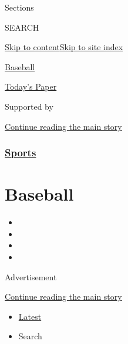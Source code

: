 Sections

SEARCH

\protect\hyperlink{site-content}{Skip to
content}\protect\hyperlink{site-index}{Skip to site index}

\href{https://www.nytimes.com/section/sports/baseball}{Baseball}

\href{https://myaccount.nytimes.com/auth/login?response_type=cookie\&client_id=vi}{}

\href{https://www.nytimes.com/section/todayspaper}{Today's Paper}

Supported by

\protect\hyperlink{after-sponsor}{Continue reading the main story}

\hypertarget{sports}{%
\subsubsection{\texorpdfstring{\href{/section/sports}{Sports}}{Sports}}\label{sports}}

\hypertarget{baseball}{%
\section{Baseball}\label{baseball}}

\begin{itemize}
\item
\item
\item
\item
\end{itemize}

Advertisement

\protect\hyperlink{after-subheader}{Continue reading the main story}

\begin{itemize}
\tightlist
\item
  \protect\hyperlink{stream-panel}{Latest}
\item
  Search
\end{itemize}

